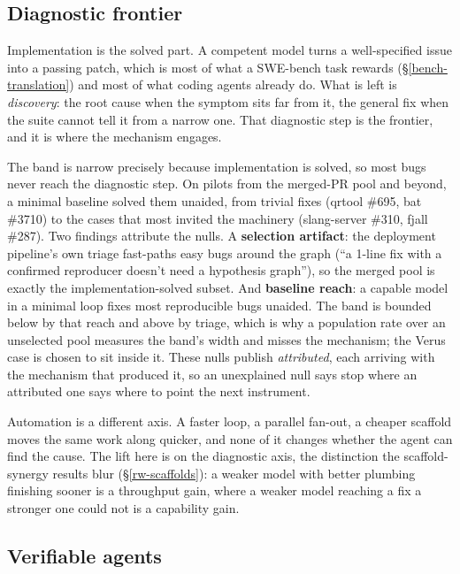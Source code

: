 \documentclass[
  10pt,
]{article}
\newcounter{none} %
\begin{document}
\subsection{Diagnostic frontier}\label{null-regime}

Implementation is the solved part. A competent model turns a
well-specified issue into a passing patch, which is most of what a
SWE-bench task rewards (\S\ref{bench-translation}) and most of what
coding agents already do. What is left is \emph{discovery}: the root
cause when the symptom sits far from it, the general fix when the suite
cannot tell it from a narrow one. That diagnostic step is the frontier,
and it is where the mechanism engages.

The band is narrow precisely because implementation is solved, so most
bugs never reach the diagnostic step. On pilots from the merged-PR pool
and beyond, a minimal baseline solved them unaided, from trivial fixes
(qrtool \#695, bat \#3710) to the cases that most invited the machinery
(slang-server \#310, fjall \#287). Two findings attribute the nulls. A
\textbf{selection artifact}: the deployment pipeline's own triage
fast-paths easy bugs around the graph (``a 1-line fix with a confirmed
reproducer doesn't need a hypothesis graph''), so the merged pool is
exactly the implementation-solved subset. And \textbf{baseline reach}: a
capable model in a minimal loop fixes most reproducible bugs unaided.
The band is bounded below by that reach and above by triage, which is
why a population rate over an unselected pool measures the band's width
and misses the mechanism; the Verus case is chosen to sit inside it.
These nulls publish \emph{attributed}, each arriving with the mechanism
that produced it, so an unexplained null says stop where an attributed
one says where to point the next instrument.

Automation is a different axis. A faster loop, a parallel fan-out, a
cheaper scaffold moves the same work along quicker, and none of it
changes whether the agent can find the cause. The lift here is on the
diagnostic axis, the distinction the scaffold-synergy results blur
(\S\ref{rw-scaffolds}): a weaker model with better plumbing finishing
sooner is a throughput gain, where a weaker model reaching a fix a
stronger one could not is a capability gain.

\subsection{Verifiable agents}\label{verifiable-agents}
\end{document}
